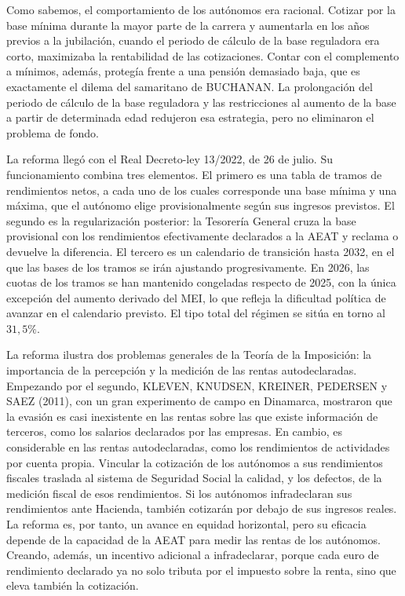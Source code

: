 \documentclass[10pt,a4paper]{article}
\begin{document}
Como sabemos, el comportamiento de los autónomos era racional. Cotizar por la base mínima durante la mayor parte de la carrera y aumentarla en los años previos a la jubilación, cuando el periodo de cálculo de la base reguladora era corto, maximizaba la rentabilidad de las cotizaciones. Contar con el complemento a mínimos, además, protegía frente a una pensión demasiado baja, que es exactamente el dilema del samaritano de BUCHANAN. La prolongación del periodo de cálculo de la base reguladora y las restricciones al aumento de la base a partir de determinada edad redujeron esa estrategia, pero no eliminaron el problema de fondo.

La reforma llegó con el Real Decreto-ley 13/2022, de 26 de julio. Su funcionamiento combina tres elementos. El primero es una tabla de tramos de rendimientos netos, a cada uno de los cuales corresponde una base mínima y una máxima, que el autónomo elige provisionalmente según sus ingresos previstos. El segundo es la regularización posterior: la Tesorería General cruza la base provisional con los rendimientos efectivamente declarados a la AEAT y reclama o devuelve la diferencia. El tercero es un calendario de transición hasta 2032, en el que las bases de los tramos se irán ajustando progresivamente. En 2026, las cuotas de los tramos se han mantenido congeladas respecto de 2025, con la única excepción del aumento derivado del MEI, lo que refleja la dificultad política de avanzar en el calendario previsto. El tipo total del régimen se sitúa en torno al $31,5\%$.

La reforma ilustra dos problemas generales de la Teoría de la Imposición: la importancia de la percepción y la medición de las rentas autodeclaradas. Empezando por el segundo, KLEVEN, KNUDSEN, KREINER, PEDERSEN y SAEZ (2011), con un gran experimento de campo en Dinamarca, mostraron que la evasión es casi inexistente en las rentas sobre las que existe información de terceros, como los salarios declarados por las empresas. En cambio, es considerable en las rentas autodeclaradas, como los rendimientos de actividades por cuenta propia. Vincular la cotización de los autónomos a sus rendimientos fiscales traslada al sistema de Seguridad Social la calidad, y los defectos, de la medición fiscal de esos rendimientos. Si los autónomos infradeclaran sus rendimientos ante Hacienda, también cotizarán por debajo de sus ingresos reales. La reforma es, por tanto, un avance en equidad horizontal, pero su eficacia depende de la capacidad de la AEAT para medir las rentas de los autónomos. Creando, además, un incentivo adicional a infradeclarar, porque cada euro de rendimiento declarado ya no solo tributa por el impuesto sobre la renta, sino que eleva también la cotización. 
\end{document}
